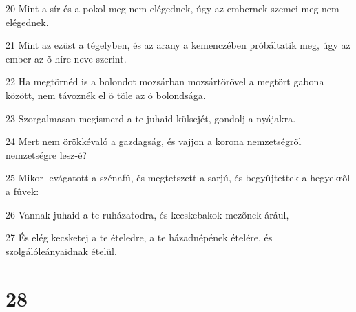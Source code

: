\par 20 Mint a sír és a pokol meg nem elégednek, úgy az embernek szemei meg nem elégednek.
\par 21 Mint az ezüst a tégelyben, és az arany a kemenczében próbáltatik meg, úgy az ember az õ híre-neve szerint.
\par 22 Ha megtörnéd is a bolondot mozsárban mozsártörõvel a megtört gabona között, nem távoznék el õ tõle az õ bolondsága.
\par 23 Szorgalmasan megismerd a te juhaid külsejét, gondolj a nyájakra.
\par 24 Mert nem örökkévaló a gazdagság, és vajjon a korona nemzetségrõl nemzetségre lesz-é?
\par 25 Mikor levágatott a szénafû, és megtetszett a sarjú, és begyûjtettek a hegyekrõl a fûvek:
\par 26 Vannak juhaid a te ruházatodra, és kecskebakok mezõnek árául,
\par 27 És elég kecsketej a te ételedre, a te házadnépének ételére, és szolgálóleányaidnak ételül.

\chapter{28}

